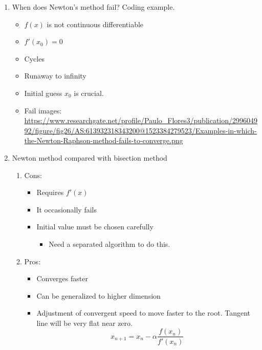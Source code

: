 \documentclass{article}
\theoremstyle{remark}
\begin{document}
\begin{enumerate}
\item When does Newton's method fail? Coding example.
\begin{itemize}
\item $f(x)$ is  not continuous differentiable 
\item $f'(x_0) = 0$
\item Cycles
\item Runaway to infinity
\item Initial guess $x_0$ is crucial.
\item Fail images: \url{https://www.researchgate.net/profile/Paulo_Flores3/publication/299604992/figure/fig26/AS:613932318343200@1523384279523/Examples-in-which-the-Newton-Raphson-method-fails-to-converge.png}
\end{itemize}

\item Newton method compared with bisection method
\begin{enumerate}
\item Cons:
\begin{itemize}
\item Requires $f'(x)$
\item It occasionally fails
\item Initial value must be chosen carefully
\begin{itemize}
\item Need a separated algorithm to do this.
\end{itemize}
\end{itemize}
\item Pros:
\begin{itemize}
\item Converges faster
\item Can be generalized to higher dimension
\item Adjustment of convergent speed to move faster to the root. Tangent line will be very flat near zero.
$$
x_{n+1} = x_n - \alpha \frac{f(x_n)}{f'(x_n)}
$$
\end{itemize}
\end{enumerate}


\end{enumerate}
\end{document}

